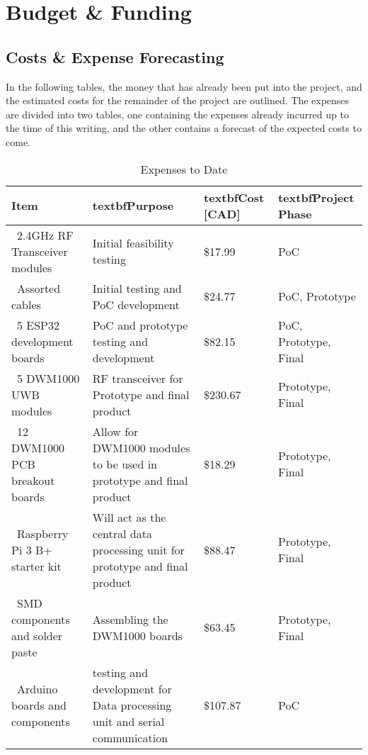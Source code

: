 \setcounter{section}{3}
\section{Budget \& Funding}
\bigskip

\subsection{Costs \& Expense Forecasting}
In the following tables, the money that has already been put into the project, and the estimated costs for the remainder of the project are outlined. The expenses are divided into two tables, one containing the expenses already incurred up to the time of this writing, and the other contains a forecast of the expected costs to come.

\begin{table}[H]
\centering
\begin{tabular}{ | m{3cm} | m{6.5cm} |m{3cm}|m{3cm}}
\hline
\textbf{Item} & textbf{Purpose} & textbf{Cost [CAD]} & textbf{Project Phase}  \\
\hline
\ 2.4GHz RF Transceiver modules & Initial feasibility testing & \$17.99 & PoC \\
\hline
\ Assorted cables & Initial testing and PoC development & \$24.77 & PoC, Prototype \\
\hline
\ 5 ESP32 development boards & PoC and prototype testing and development & \$82.15 & PoC, Prototype, Final \\
\hline
\ 5 DWM1000 UWB modules & RF transceiver for Prototype and final product & \$230.67 & Prototype, Final \\
\hline
\ 12 DWM1000 PCB breakout boards & Allow for DWM1000 modules to be used in prototype and final product & \$18.29 & Prototype, Final \\
\hline
\ Raspberry Pi 3 B+ starter kit & Will act as the central data processing unit for prototype and final product & \$88.47 & Prototype, Final \\
\hline
\ SMD components and solder paste & Assembling the DWM1000 boards & \$63.45 & Prototype, Final\\
\hline
\ Arduino boards and components & testing and development for Data processing unit and serial communication & \$107.87 & PoC \\
\hline
\end{tabular}
\caption{Expenses to Date}
\end{table}


